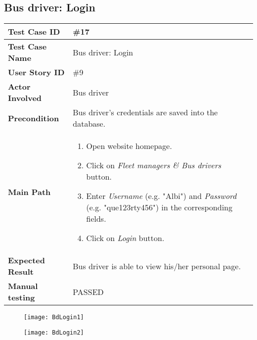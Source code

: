 \subsection{Bus driver: Login}
\begin{center}
	\begin{tabular} { | m{3.5cm} | m{9.5cm} | }
		\hline
		\textbf{Test Case ID} & \#17\\
		\hline
		\textbf{Test Case Name} & Bus driver: Login\\
		\hline
		\textbf{User Story ID} & \#9\\
		\hline
		\textbf{Actor Involved} & Bus driver\\
		\hline
		\textbf{Precondition} & Bus driver's credentials are saved into the database.\\
		\hline
		\textbf{Main Path} & 
		\begin{enumerate}
			\item Open website homepage.
			\item Click on \textit{Fleet managers \& Bus drivers} button.
			\item Enter \textit{Username} (e.g. "Albi") and \textit{Password} (e.g. "que123rty456") in the corresponding fields.
			\item Click on \textit{Login} button.
		\end{enumerate}\\
		\hline
		\textbf{Expected Result} & Bus driver is able to view his/her personal page.\\
		\hline
\textbf{Manual testing} & PASSED\\
\hline
\end{tabular}
\end{center}
\begin{figure}[H]
\centering
\texttt{[image: BdLogin1]}
\end{figure}
\begin{figure}[H]
\centering
\texttt{[image: BdLogin2]}
\end{figure}
\newpage
